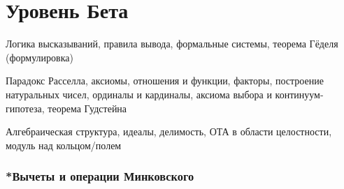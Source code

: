 \part*{Уровень Бета}

\renewcommand{\thechapter}{B.\arabic{chapter}}

\setcounter{chapter}{0}


Логика высказываний, правила вывода, формальные системы, теорема Гёделя (формулировка)

Парадокс Расселла, аксиомы, отношения и функции, факторы, построение натуральных чисел, ординалы и кардиналы, аксиома выбора и континуум-гипотеза, теорема Гудстейна

Алгебраическая структура, идеалы, делимость, ОТА в области целостности, модуль над кольцом/полем





\section{*Вычеты и операции Минковского}\label{Faktor}




